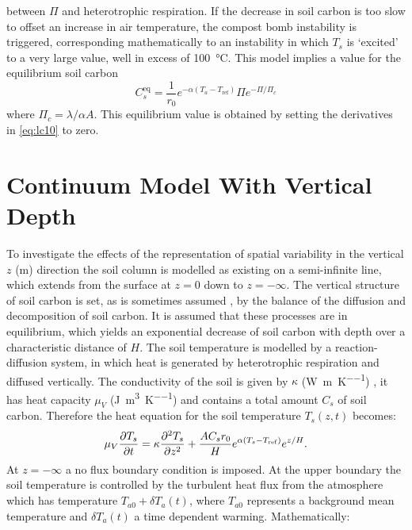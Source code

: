 between $\Pi$ and heterotrophic respiration.  
If the decrease in soil carbon is too slow to offset an increase in air temperature, the compost bomb instability is triggered, corresponding mathematically to an instability in which
$T_s$ is `excited' to a very large value, well in excess of \SI{100}{\degreeCelsius}. This model implies a value for the equilibrium soil carbon
\begin{equation}
  \label{eq:equilibrium_soil_carbon}
  C_s^{\mathrm{eq}} = \frac{1}{r_0}e^{-\alpha \left( T_a - T_{\mathrm{ref}}\right)} \Pi e^{-\Pi/\Pi_c}
\end{equation}
where $\Pi_c = \lambda /\alpha A$. This equilibrium value is obtained by setting the derivatives in \cref{eq:lc10} to zero.

\section{Continuum Model With Vertical Depth}
\label{sec:continuum_model}
To investigate the effects of the representation of spatial variability in the vertical $z$ (\si{\meter}) direction the soil column is
modelled as existing on a semi-infinite line, which extends from the surface at $z = 0$ down to $z = -\infty$. The vertical structure of
soil carbon is set, as is sometimes assumed \parencite{Burke2017}, by the balance of the diffusion and decomposition of soil carbon. It is assumed that these processes are in equilibrium,
which yields an exponential decrease of soil carbon with depth over a characteristic distance of $H$. The soil temperature is modelled by a reaction-diffusion system, in which heat is generated
by heterotrophic respiration and diffused vertically. The conductivity of the soil is given by $\kappa$ (\si{\watt\per\meter\per\kelvin}) \parencite{Best2005},
it has heat capacity $\mu_V$ (\si{\joule\per\cubic\meter\per\kelvin}) and contains a total amount $C_s$ of soil carbon. Therefore the heat equation
for the soil temperature $T_s(z,t)$ becomes:
\begin{equation}
  \label{eq:one_d_model}
  \mu_V \pdv{T_s}{t} = \kappa \pdv[2]{T_s}{z} + \frac{AC_sr_0}{H}e^{\alpha (T_s - T_{\mathrm{ref}})}e^{z/H}.
\end{equation}
At $z=-\infty$ a no flux boundary condition is imposed.
At the upper boundary the soil temperature is controlled by the turbulent heat flux from the atmosphere which has temperature
$T_{a0} + \delta T_a(t)$, where $T_{a0}$ represents a background mean temperature and $\delta T_a(t)$ a time dependent warming. Mathematically:

